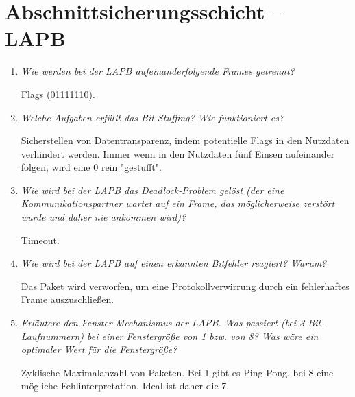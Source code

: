 \documentclass[hidelinks]{article}
\begin{document}
\section{Abschnittsicherungsschicht -- LAPB}
\begin{enumerate}
\item \textit{Wie werden bei der LAPB aufeinanderfolgende Frames getrennt?}

Flags (01111110).

\item \textit{Welche Aufgaben erfüllt das Bit-Stuffing? Wie funktioniert es?}

Sicherstellen von Datentransparenz, indem potentielle Flags in den Nutzdaten verhindert werden. Immer wenn in den Nutzdaten fünf Einsen aufeinander folgen, wird eine 0 rein "gestufft".

\item \textit{Wie wird bei der LAPB das Deadlock-Problem gelöst (der eine Kommunikationspartner wartet auf ein Frame, das möglicherweise zerstört wurde und daher nie ankommen wird)?}

Timeout.

\item \textit{Wie wird bei der LAPB auf einen erkannten Bitfehler reagiert? Warum?}

Das Paket wird verworfen, um eine Protokollverwirrung durch ein fehlerhaftes Frame auszuschließen.

\item \textit{Erläutere den Fenster-Mechanismus der LAPB. Was passiert (bei 3-Bit-Laufnummern) bei einer Fenstergröße von 1 bzw. von 8? Was wäre ein optimaler Wert für die Fenstergröße?}

Zyklische Maximalanzahl von Paketen. Bei 1 gibt es Ping-Pong, bei 8 eine mögliche Fehlinterpretation. Ideal ist daher die 7.
\end{enumerate}
\end{document}
